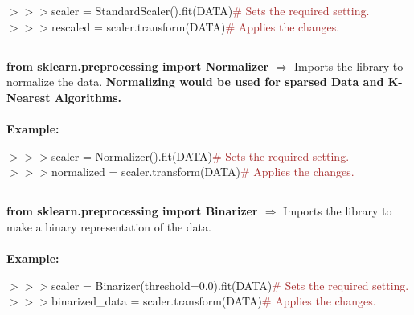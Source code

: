 \documentclass[a4paper,18pt]{article}
\begin{document}
$>>>$scaler = StandardScaler().fit(DATA){\textcolor{brown}{\# Sets the required setting.}}\\

$>>>$rescaled = scaler.transform(DATA){\textcolor{brown}{\# Applies the changes.}}\\


\subsection{\colorbox {matgreen}{\color{white}{\large from sklearn.preprocessing import Normalizer}}}
\textbf{from sklearn.preprocessing import Normalizer $\Rightarrow$} Imports the library to normalize the data. {\textbf{\textcolor{important}{Normalizing would be used for sparsed Data and K-Nearest Algorithms.}}}\\\\
\textbf{Example:\\}

$>>>$scaler = Normalizer().fit(DATA){\textcolor{brown}{\# Sets the required setting.}}\\

$>>>$normalized = scaler.transform(DATA){\textcolor{brown}{\# Applies the changes.}}\\


\subsection{\colorbox {matgreen}{\color{white}{\large from sklearn.preprocessing import Binarizer}}}
\textbf{from sklearn.preprocessing import Binarizer $\Rightarrow$} Imports the library to make a binary representation of the data.\\\\
\textbf{Example:\\}

$>>>$scaler = Binarizer(threshold=0.0).fit(DATA){\textcolor{brown}{\# Sets the required setting.}}\\

$>>>$binarized\_data = scaler.transform(DATA){\textcolor{brown}{\# Applies the changes.}}\\


\end{document}
